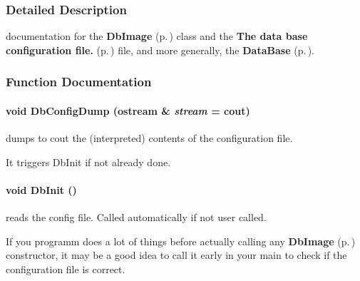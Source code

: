 \subsubsection{Detailed Description}
documentation for the {\bf Db\-Image} {\rm (p.\,\pageref{class_dbimage})} class and the {\bf The data base configuration file.} {\rm (p.\,\pageref{dbconfig})} file, and more generally, the {\bf Data\-Base} {\rm (p.\,\pageref{database_page})}.





\subsubsection{Function Documentation}
\paragraph{\setlength{\rightskip}{0pt plus 5cm}void Db\-Config\-Dump (ostream \& {\em stream} = cout)}\hfill\label{dbimage_h_a15}


dumps to cout the (interpreted) contents of the configuration file.

It triggers Db\-Init if not already done. 
\paragraph{\setlength{\rightskip}{0pt plus 5cm}void Db\-Init ()}\hfill\label{dbimage_h_a14}


reads the config file. Called automatically if not user called.

If you programm does a lot of things before actually calling any {\bf Db\-Image} {\rm (p.\,\pageref{class_dbimage})} constructor,  it may be a good idea to call it early in your main to check if the configuration file is correct. 